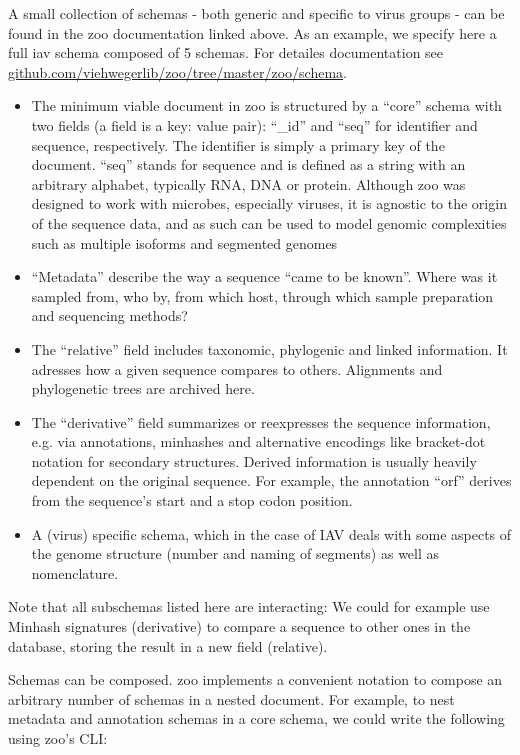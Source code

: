 A small collection of schemas - both generic and specific to virus groups - can be found in the zoo documentation linked above. As an example, we specify here a full \gls{iav} schema composed of 5 schemas. For detailes documentation see \\ \hyperlink{https://github.com/viehwegerlib/zoo/tree/master/zoo/schema}{github.com/viehwegerlib/zoo/tree/master/zoo/schema}.


\begin{itemize}
    \item The minimum viable document in zoo is structured by a ``core'' schema with two fields (a field is a key: value pair): ``\_id'' and ``seq'' for identifier and sequence, respectively. The identifier is simply a primary key of the document. ``seq'' stands for sequence and is defined as a string with an arbitrary alphabet, typically RNA, DNA or protein. Although zoo was designed to work with microbes, especially viruses, it is agnostic to the origin of the sequence data, and as such can be used to model genomic complexities such as multiple isoforms and segmented genomes
    \item ``Metadata'' describe the way a sequence ``came to be known''. Where was it sampled from, who by, from which host, through which sample preparation and sequencing methods?
    \item The ``relative'' field includes taxonomic, phylogenic and linked information. It adresses how a given sequence compares to others. Alignments and phylogenetic trees are archived here.
    \item The ``derivative'' field summarizes or reexpresses the sequence information, e.g. via annotations, minhashes and alternative encodings like bracket-dot notation for secondary structures. Derived information is usually heavily dependent on the original sequence. For example, the annotation ``\gls{orf}'' derives from the sequence's start and a stop codon position.
    \item A (virus) specific schema, which in the case of IAV deals with some aspects of the genome structure (number and naming of segments) as well as nomenclature.
\end{itemize}

Note that all subschemas listed here are interacting: We could for example use Minhash signatures (derivative) to compare a sequence to other ones in the database, storing the result in a new field (relative).

Schemas can be composed. zoo implements a convenient notation to compose an arbitrary number of schemas in a nested document. For example, to nest metadata and annotation schemas in a core schema, we could write the following using zoo’s CLI:


